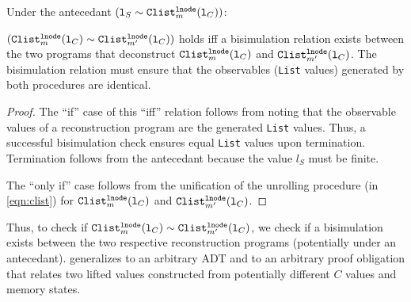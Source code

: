 \begin{theorem}\label{theorem:clistsEqual}
Under the antecedant
$({\tt l}_S \sim{} {\tt Clist}_m^{{\tt lnode}}({\tt l}_C))$:

$({\tt Clist}_m^{{\tt lnode}}({\tt l}_C)
\sim{}
{\tt Clist}_{m'}^{{\tt lnode}}({\tt l}_C))$
holds iff a bisimulation relation
exists between the two programs that
deconstruct
${\tt Clist}_m^{{\tt lnode}}({\tt l}_C)$
and
${\tt Clist}_{m'}^{{\tt lnode}}({\tt l}_C)$.
The bisimulation relation must ensure that the
observables ({\tt List} values) generated by both procedures are
identical.
\end{theorem}
\begin{proof}\let\qed\relax
The ``if'' case of this ``iff'' relation follows
from noting that the observable values of
a reconstruction program are the
generated {\tt List} values. Thus, a
successful bisimulation
check ensures equal
{\tt List}
values upon termination. Termination
follows from the antecedant because the
\SpecL{} value $l_S$ must be finite.

The ``only if'' case
follows from the unification of the
unrolling procedure (in \cref{eqn:clist}) for
${\tt Clist}_m^{{\tt lnode}}({\tt l}_C)$
and
${\tt Clist}_{m'}^{{\tt lnode}}({\tt l}_C)$.

\end{proof}

Thus, to check if ${\tt Clist}_m^{{\tt lnode}}({\tt l}_C)
\sim{} {\tt Clist}_{m'}^{{\tt lnode}}({\tt l}_C)$, we
check if a bisimulation exists
between the two respective reconstruction programs (potentially
under an antecedant).   generalizes
to an arbitrary ADT and to an arbitrary proof obligation that
relates two lifted values constructed from potentially different
$C$ values and memory states.

